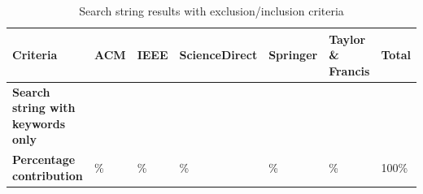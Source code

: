 \begin{table}[htbp]
	\centering
	\caption{Search string results with exclusion/inclusion criteria}
	\label{table:search_results_exclusion}
	\begin{tabular}{p{4.8cm}p{1.7cm}p{1.7cm}p{1.7cm}p{1.7cm}p{2cm}p{1.4cm}}
		\toprule
		\textbf{Criteria}                         & \textbf{ACM} & \textbf{IEEE} & \textbf{ScienceDirect} & \textbf{Springer} & \textbf{Taylor \& Francis} & \textbf{Total} \\
		\midrule
		\textbf{Search string with keywords only} & \iacm{}      & \iieee{}      & \isd{}                 & \ispr{}           & \itf{}                     & \itot{}        \\
		\addlinespace[0.8em]
		\textbf{Percentage contribution}          & \iacmp{}\%   & \iieeep{}\%   & \isdp{}\%              & \isprp{}\%        & \itfp{}\%                  & 100\%          \\
		\bottomrule
	\end{tabular}
\end{table}

